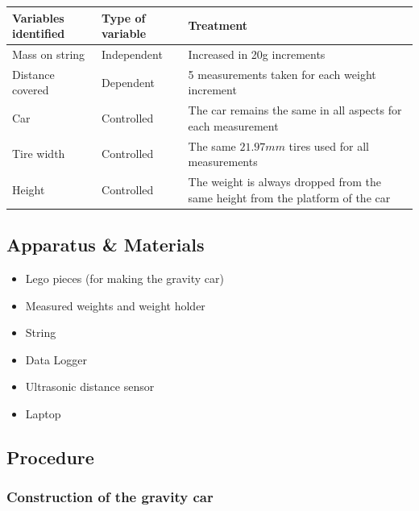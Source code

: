 \documentclass[titlepage,12pt]{article}
\begin{document}
\begin{table}[h!]
    \centering
    \label{my-label}
    \begin{tabular}{l|l|p{5cm}}
        Variables identified & Type of variable   & Treatment\\
        \hline
        \hline
        Mass on string       & Independent        & Increased in 20g increments\\
        \hline
        Distance covered     & Dependent          & 5 measurements taken for each weight increment\\
        \hline
        Car                  & Controlled         & The car remains the same in all aspects for each measurement\\
        \hline
        Tire width           & Controlled         & The same $21.97mm$ tires used for all measurements\\
        \hline
        Height               & Controlled         & The weight is always dropped from the same height from the platform of the car\\
    \end{tabular}
\end{table}
\FloatBarrier

\subsection{Apparatus \& Materials}

\begin{itemize}
    \item Lego pieces (for making the gravity car)
    \item Measured weights and weight holder
    \item String
    \item Data Logger
    \item Ultrasonic distance sensor
    \item Laptop
\end{itemize}

\subsection{Procedure}

\subsubsection{Construction of the gravity car}
\end{document}
